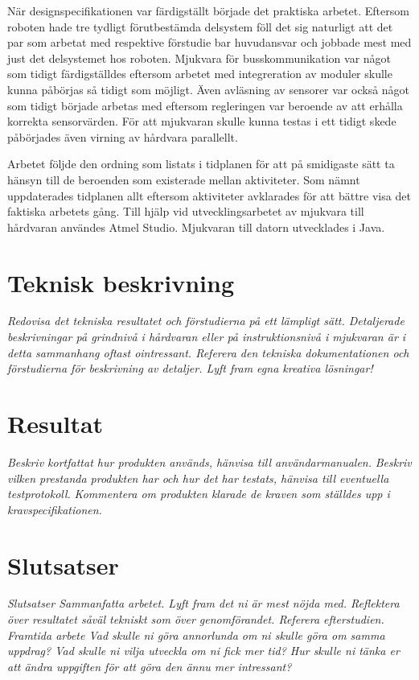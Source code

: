 \documentclass[11pt]{article}
\begin{document}
\begin{flushleft}
När designspecifikationen var färdigställt började det praktiska arbetet. Eftersom roboten hade tre tydligt förutbestämda delsystem föll det sig naturligt att det par som arbetat med respektive förstudie bar huvudansvar och jobbade mest med just det delsystemet hos roboten. Mjukvara för busskommunikation var något som tidigt färdigställdes eftersom arbetet med integreration av moduler skulle kunna påbörjas så tidigt som möjligt. Även avläsning av sensorer var också något som tidigt började arbetas med eftersom regleringen var beroende av att erhålla korrekta sensorvärden. För att mjukvaran skulle kunna testas i ett tidigt skede påbörjades även virning av hårdvara parallellt. 

Arbetet följde den ordning som listats i tidplanen för att på smidigaste sätt ta hänsyn till de beroenden som existerade mellan aktiviteter. Som nämnt uppdaterades tidplanen allt eftersom aktiviteter avklarades för att bättre visa det faktiska arbetets gång. Till hjälp vid utvecklingsarbetet av mjukvara till hårdvaran användes Atmel Studio. Mjukvaran till datorn utvecklades i Java. 

\pagebreak

\section{Teknisk beskrivning}
\textit{Redovisa det tekniska resultatet och förstudierna på ett lämpligt sätt. Detaljerade beskrivningar på grindnivå i hårdvaran eller på instruktionsnivå i mjukvaran är i detta sammanhang oftast ointressant. Referera den tekniska dokumentationen och förstudierna för beskrivning av detaljer. Lyft fram egna kreativa lösningar!}
\pagebreak

\section{Resultat}
\textit{Beskriv kortfattat hur produkten används, hänvisa till användarmanualen.}
\textit{Beskriv vilken prestanda produkten har och hur det har testats, hänvisa till eventuella testprotokoll.}
\textit{Kommentera om produkten klarade de kraven som ställdes upp i kravspecifikationen. }

\pagebreak

\section{Slutsatser}
\textit{Slutsatser
Sammanfatta arbetet. 
Lyft fram det ni är mest nöjda med.
Reflektera över resultatet såväl tekniskt som över genomförandet. Referera efterstudien.}
\textit{Framtida arbete
Vad skulle ni göra annorlunda om ni skulle göra om samma uppdrag?
Vad skulle ni vilja utveckla om ni fick mer tid?
Hur skulle ni tänka er att ändra uppgiften för att göra den ännu mer intressant?}


\end{flushleft}
\end{document}
